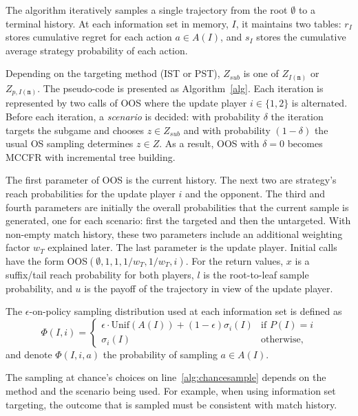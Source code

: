 \documentclass{aamas2015}
\newcommand{\ttm}{\mathtt{m}}
\begin{document}
The algorithm iteratively samples a single trajectory from the root $\emptyset$ to a 
terminal history. At each information set in memory, $I$, it maintains two tables: $r_I$ stores cumulative 
regret for each action $a \in A(I)$, and $s_I$ stores the cumulative average strategy probability of each 
action. 

Depending on the targeting method (IST or PST), $Z_{sub}$ is one of $Z_{I(\ttm)}$ or $Z_{p,I(\ttm)}$. 
The pseudo-code is presented as Algorithm~\ref{alg}. 
Each iteration is represented by two calls of OOS where the update player $i \in \{1,2\}$ is alternated. 
Before each iteration, a {\it scenario} is decided: 
with probability $\delta$ the iteration targets the subgame and chooses $z \in Z_{sub}$
and with probability $(1-\delta)$ the usual OS sampling determines $z \in Z$. 
As a result, OOS with $\delta=0$ becomes MCCFR with incremental tree building.

The first parameter of OOS is the current history. 
The next two are strategy's reach probabilities for the update player $i$ and the opponent. 
The third and fourth parameters are initially the overall probabilities that the current sample is generated, one for each scenario: first the targeted and then the untargeted.
With non-empty match history, these two parameters include an additional weighting factor $w_T$ explained later.
The last parameter is the update player. Initial calls have the form OOS$(\emptyset, 1, 1, 1/w_T, 1/w_T, i)$. 
For the return values, $x$ is a suffix/tail reach probability for both players, 
$l$ is the root-to-leaf sample probability, and $u$ is the payoff of the trajectory in view 
of the update player. 

The $\epsilon$-on-policy sampling distribution used at each information set
is defined as 
\begin{equation*}
\label{eq:ossample}
\Phi(I,i) = \left\{
\begin{array}{ll}
\epsilon \cdot \mbox{Unif}(A(I)) + (1-\epsilon)\sigma_i(I) & \mbox{if } P(I) = i\\ 
\sigma_i(I) & \mbox{otherwise,}
\end{array} \right.
\end{equation*}
and denote $\Phi(I,i,a)$ the probability of sampling $a \in A(I)$. 

The sampling at chance's choices on line~\ref{alg:chancesample} depends on the method and the scenario being used. For example, when using information set targeting, the outcome that is sampled must be consistent with match history.
\end{document}
